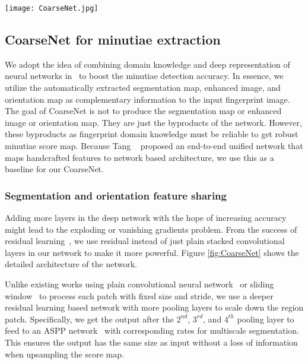 \documentclass[10pt,twocolumn,letterpaper]{article}
\begin{document}
\begin{figure*}[tbp]
\centering
\texttt{[image: CoarseNet.jpg]}
\caption{CoarseNet architecture.}
\label{fig:CoarseNet}
\end{figure*}

\subsection{CoarseNet for minutiae extraction}
\label{sec:sec_CoarseNet}
We adopt the idea of combining domain knowledge and deep representation of neural networks in~\cite{tang2017FingerNet} to boost the minutiae detection accuracy. In essence, we utilize the automatically extracted segmentation map, enhanced image, and orientation map as complementary information to the input fingerprint image. The goal of CoarseNet is not to produce the segmentation map or enhanced image or orientation map. They are just the byproducts of the network. However, these byproducts as fingerprint domain knowledge must be reliable to get robust minutiae score map. Because Tang \etal~\cite{tang2017FingerNet} proposed an end-to-end unified network that maps handcrafted features to network based architecture, we use this as a baseline for our CoarseNet.

\subsubsection{Segmentation and orientation feature sharing}
\label{sec:sec_Segmentation_and_Orientation}
Adding more layers in the deep network with the hope of increasing accuracy might lead to the exploding or vanishing gradients problem. From the success of residual learning~\cite{he2016deep}, we use residual instead of just plain stacked convolutional layers in our network to make it more powerful. Figure \ref{fig:CoarseNet} shows the detailed architecture of the network. 

Unlike existing works using plain convolutional neural network~\cite{tang2017CNN, tang2017FingerNet} or sliding window~\cite{sankaran2014latent, Darlow2017DeepLearn} to process each patch with fixed size and stride, we use a deeper residual learning based network with more pooling layers to scale down the region patch. Specifically, we get the output after the $2^{nd}$, $3^{rd}$, and $4^{th}$ pooling layer to feed to an ASPP network~\cite{chen2016deeplab} with corresponding rates for multiscale segmentation. This ensures the output has the same size as input without a loss of  information when upsampling the score map.
\end{document}
